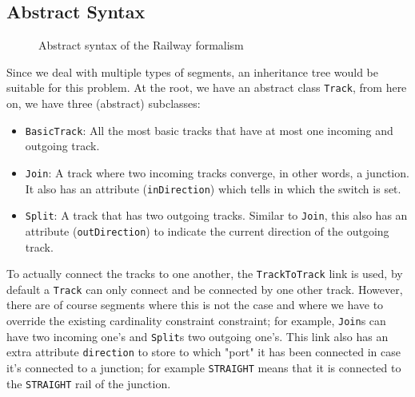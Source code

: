 \documentclass{article}
\begin{document}
\subsection{Abstract Syntax}

\begin{figure}[H]
    \begin{center}
    \end{center}
    \caption{Abstract syntax of the Railway formalism}
    \label{abstract_syntax}
\end{figure}

Since we deal with multiple types of segments, an inheritance tree would be suitable for this problem. At the root, we have an abstract class \texttt{Track}, from here on, we have three (abstract) subclasses:

\begin{itemize}
    \item \texttt{BasicTrack}: All the most basic tracks that have at most one incoming and outgoing track.
    \item \texttt{Join}: A track where two incoming tracks converge, in other words, a junction. It also has an attribute (\texttt{inDirection}) which tells in which the switch is set.
    \item \texttt{Split}: A track that has two outgoing tracks. Similar to \texttt{Join}, this also has an attribute (\texttt{outDirection}) to indicate the current direction of the outgoing track.
\end{itemize}

To actually connect the tracks to one another, the \texttt{TrackToTrack} link is used, by default a \texttt{Track} can only connect and be connected by one other track. However, there are of course segments where this is not the case and where we have to override the existing cardinality constraint constraint; for example, \texttt{Join}s can have two incoming one's and \texttt{Split}s two outgoing one's. This link also has an extra attribute \texttt{direction} to store to which "port" it has been connected in case it's connected to a junction; for example \texttt{STRAIGHT} means that it is connected to the \texttt{STRAIGHT} rail of the junction.
\end{document}
